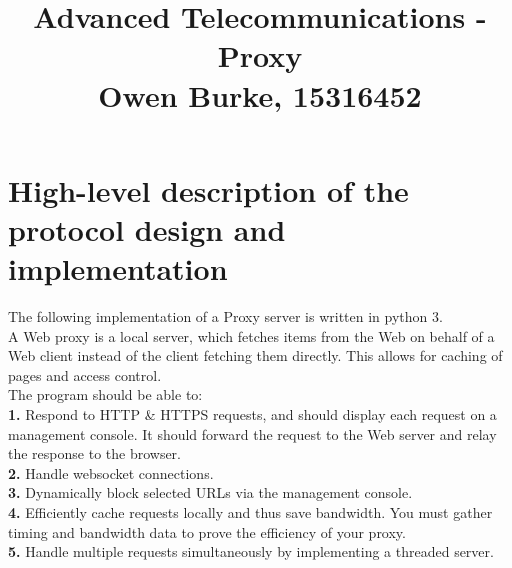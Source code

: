 \documentclass{report}
\title{\textbf{Advanced Telecommunications - Proxy}\\Owen Burke, 15316452}
\begin{document}

    \maketitle
    \section*{\hfil High-level description of the protocol design and implementation \hfil}
    The following implementation of a Proxy server is written in python 3.\\
    A Web proxy is a local server, which fetches items from the Web on behalf of a Web client instead of the client fetching them directly. 
    This allows for caching of pages and access control.\\
    The program should be able to:\\
    \textbf{1.} Respond to HTTP \& HTTPS requests, and should display each request on a management console. It should forward the request to the Web server and relay the response to the
    browser.\\
    \textbf{2.} Handle websocket connections.\\
    \textbf{3.} Dynamically block selected URLs via the management console.\\
    \textbf{4.} Efficiently cache requests locally and thus save bandwidth. You must gather timing and bandwidth data to prove the efficiency of your proxy.\\
    \textbf{5.} Handle multiple requests simultaneously by implementing a threaded server.\\\\
\end{document}
